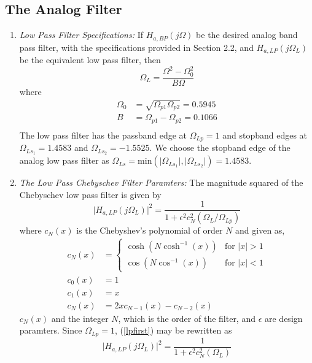 \documentclass{article}
\begin{document}
\subsection{The Analog Filter}
\begin{enumerate}

\item {\em Low Pass Filter Specifications:}  If $H_{a, BP}(j\Omega)$ be the desired analog band
pass filter,  with the specifications provided in Section 2.2, and $H_{a,LP}(j\Omega_L)$ 
be the equivalent low pass filter, then
\begin{equation}
\label{transition}
\Omega_L = \frac{\Omega^2 - \Omega_0^2}{B\Omega}
\end{equation}
where 
\begin{align}
    \Omega_0 &= \sqrt{\Omega_{p1}\Omega_{p2}} = 0.5945 \\
    B &= \Omega_{p1} - \Omega_{p2} = 0.1066 \\
\end{align}
The low pass filter has the passband edge at $\Omega_{Lp} = 1$ and stopband edges at $\Omega_{Ls_1} = 1.4583$ and $\Omega_{Ls_2} = -1.5525$.  We choose the stopband edge of the analog low pass filter as $\Omega_{Ls} = \mbox{min}(\vert \Omega_{Ls_1}\vert,\vert \Omega_{Ls_2}\vert) = 1.4583$.
\item {\em The Low Pass Chebyschev Filter Paramters:}  The magnitude squared of the Chebyschev low pass filter is given by 
\begin{equation}
\label{lpfirst}
\vert H_{a,LP}(j\Omega_L)\vert^2 = \frac{1}{1 + \epsilon^2c_N^2(\Omega_L/\Omega_{Lp})}
\end{equation}
where $c_N(x)$ is the Chebyshev's polynomial of order $N$ and given as,
\begin{align}
c_N(x) &= 
\begin{cases} 
\cosh(N\cosh^{-1}(x)) & \text{for } |x| > 1 \\
\cos(N\cos^{-1}(x)) & \text{for } |x| < 1
\end{cases} \\
c_0(x) &= 1 \\
c_1(x) &=x \\
c_N(x) &= 2xc_{N-1}(x)-c_{N-2}(x)
\end{align}
$c_N(x)$ and the integer $N$, which is the order of the filter, and $\epsilon$ are design paramters.  Since $\Omega_{Lp} = 1$, (\ref{lpfirst}) may be rewritten as
\begin{equation}
\label{lpsecond}
\vert H_{a,LP}(j\Omega_L)\vert^2 = \frac{1}{1 + \epsilon^2c_N^2(\Omega_L)}

\end{equation}
\end{enumerate}
\end{document}
